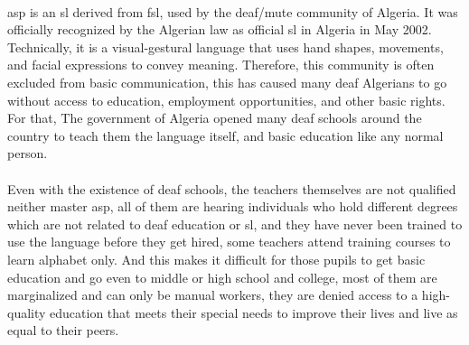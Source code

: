 \paragraph{}
\ac{asp} is an \ac{sl} derived from \ac{fsl}, used by the deaf/mute community of Algeria. It was officially recognized by the Algerian law as official \ac{sl} in Algeria in May 2002\cite{wiki}. Technically, it is a visual-gestural language that uses hand shapes, movements, and facial expressions to convey meaning. Therefore, this community is often excluded from basic communication, this has caused many deaf Algerians to go without access to education, employment opportunities, and other basic rights. For that, The government of Algeria opened many deaf schools around the country to teach them the language itself, and basic education like any normal person.
\paragraph{}
Even with the existence of deaf schools, the teachers themselves are not qualified neither master \ac{asp}, all of them are hearing individuals who hold different degrees which are not related to deaf education or \ac{sl}, and they have never been trained to use the language before they get hired, some teachers attend training courses to learn alphabet only. And this makes it difficult for those pupils to get basic education and go even to middle or high school and college, most of them are marginalized and can only be manual workers, they are denied access to a high-quality education that meets their special needs to improve their lives and live as equal to their peers.\cite{chalenges}